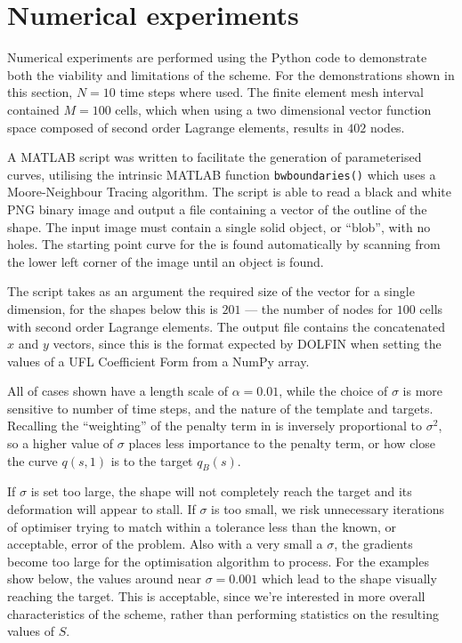\documentclass[a4paper, 12pt]{article}
\begin{document}
\section{Numerical experiments\label{sec:experiments}}

Numerical experiments are performed using the Python code to demonstrate both the
viability and limitations of the scheme. For the demonstrations shown in this
section, $N = 10$ time steps where used. The finite element mesh interval
contained $M = 100$ cells, which when using a two dimensional vector function
space composed of second order Lagrange elements, results in $402$ nodes.

A MATLAB script was written to facilitate the generation of
parameterised curves, utilising the intrinsic MATLAB function \texttt{bwboundaries()}
\cite{gonzalez2004digital} which uses a Moore-Neighbour
Tracing algorithm. The script is able to read a black and white PNG binary image and
output a file containing a vector of the outline of the shape. The input image
must contain a single solid object, or ``blob'', with no holes. The starting
point curve for the is found automatically by scanning from the lower left
corner of the image until an object is found.

The script takes as an argument the required size of the vector for a single
dimension, for the shapes below this is $201$ --- the number of nodes for $100$
cells with second order Lagrange elements. The output file contains the
concatenated $x$ and $y$ vectors, since this is the format expected by DOLFIN
when setting the values of a UFL Coefficient Form from a NumPy array. 

All of cases shown have a length scale of $\alpha = 0.01$, while the choice of
$\sigma$ is more sensitive to number of time steps, and the nature of the
template and targets. Recalling the ``weighting'' of the penalty term in 
is inversely proportional to $\sigma^2$, so a higher value of $\sigma$ places less
importance to the penalty term, or how close the curve $q(s,1)$ is to the target $q_B(s)$.

If $\sigma$ is set too large, the shape will not completely reach the target and
its deformation will appear to stall. If $\sigma$ is too small, we risk
unnecessary iterations of optimiser trying to match within a tolerance less than
the known, or acceptable, error of the problem.  Also with a very small a
$\sigma$, the gradients become too large for the optimisation algorithm to
process. For the examples show below, the values around near $\sigma = 0.001$
which lead to the shape visually reaching the target. This is acceptable, since
we're interested in more overall characteristics of the scheme, rather than
performing statistics on the resulting values of $S$.
 
\end{document}
